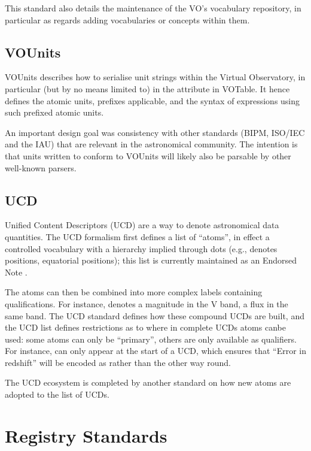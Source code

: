 \documentclass[11pt,letter]{ivoa}
\begin{document}
This standard also details the maintenance of the VO's vocabulary
repository, in particular as regards adding vocabularies or concepts
within them.

\subsection{VOUnits}

VOUnits \citep{2023ivoa.spec.1215G} describes how to serialise unit
strings within the Virtual
Observatory, in particular (but by no means limited to) in the
 attribute in VOTable.  It hence defines the atomic units,
prefixes applicable, and the syntax of expressions using such prefixed
atomic units. 

An important design goal was consistency with other standards (BIPM,
ISO/IEC and the IAU) that are relevant in the astronomical community.
The intention is that units written to conform to VOUnits will likely
also be parsable by other well-known parsers.

\subsection{UCD}

Unified Content Descriptors (UCD) \citep{2019ivoa.spec.1007G} are a way
to
denote astronomical data
quantities.  The UCD formalism first defines a list of ``atoms'', in
effect a controlled vocabulary with a hierarchy implied through dots
(e.g.,  denotes positions,  equatorial positions);
this list is currently maintained as an Endorsed Note
\citep{2021ivoa.spec.0125C}.

The atoms can then be combined into more complex labels containing
qualifications.  For instance,  denotes a
magnitude in the V band,  a flux in the same
band.  The UCD standard defines how these compound UCDs are built, and
the UCD list defines restrictions as to where in complete UCDs atoms canbe used: some atoms can only be ``primary'', others are only available
as qualifiers.  For instance,  can only appear at the
start of a UCD, which ensures that ``Error in redshift'' will be encoded as  rather than the other way round.

The UCD ecosystem is completed by another standard on how new atoms are
adopted to the list of UCDs.

\section{Registry Standards}
\end{document}
